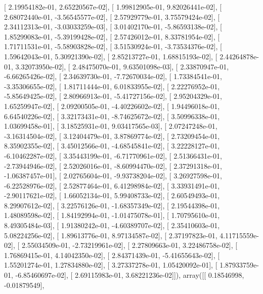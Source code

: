 \documentclass{article}
\begin{document}
       [  2.19954182e-01,   2.65220567e-02],
       [  1.99812905e-01,   9.82026441e-02],
       [  2.68072440e-01,  -3.56545577e-02],
       [  2.57929779e-01,   3.75579424e-02],
       [  2.34112313e-01,  -3.03033259e-03],
       [  3.01402170e-01,  -5.86593138e-02],
       [  1.85299083e-01,  -5.39199428e-02],
       [  2.57426012e-01,   8.33781954e-02],
       [  1.71711531e-01,  -5.58903828e-02],
       [  3.51530924e-01,  -3.73534376e-02],
       [  1.59642043e-01,   5.30921390e-02],
       [  2.85213727e-01,   1.68815193e-02],
       [  2.44264878e-01,   3.32073950e-02],
       [  2.48475070e-01,   9.63501098e-03],
       [  2.33870947e-01,  -6.66265426e-02],
       [  2.34639730e-01,  -7.72670034e-02],
       [  1.73384541e-01,  -3.35306655e-02],
       [  1.81711444e-01,   6.01833955e-02],
       [  2.22276952e-01,  -5.85649425e-02],
       [  2.80966913e-01,  -5.41727156e-02],
       [  2.95204329e-01,   1.65259947e-02],
       [  2.09200505e-01,  -4.40226602e-02],
       [  1.94496018e-01,   6.64540226e-02],
       [  3.32173431e-01,  -8.74625672e-02],
       [  3.50996338e-01,   1.03699458e-01],
       [  3.18525931e-01,   9.03417565e-03],
       [  2.07247248e-01,  -3.16314504e-02],
       [  3.12404479e-01,   3.87869774e-02],
       [  2.73209454e-01,   8.35902355e-02],
       [  3.45012566e-01,  -4.68545841e-02],
       [  3.22228127e-01,  -6.10462287e-02],
       [  3.35443199e-01,  -6.71770961e-02],
       [  2.51366431e-01,  -2.73944946e-02],
       [  2.52026016e-01,  -8.60994470e-02],
       [  2.37291318e-01,  -1.06387457e-01],
       [  2.02765604e-01,  -9.93738204e-02],
       [  3.26927598e-01,  -6.22528976e-02],
       [  2.52877464e-01,   6.41298984e-02],
       [  3.33931491e-01,  -2.90117621e-02],
       [  1.66052134e-01,   5.99408733e-02],
       [  2.60549493e-01,   8.29907612e-02],
       [  3.22576126e-01,  -1.68357349e-02],
       [  2.19544398e-01,   1.48089598e-02],
       [  1.84192994e-01,  -1.01475078e-01],
       [  1.70795610e-01,   8.49305484e-03],
       [  1.91380242e-01,  -4.60389707e-02],
       [  2.35410603e-01,   5.08224256e-02],
       [  1.89613776e-01,   8.97134587e-02],
       [  2.37197823e-01,   4.11715559e-02],
       [  2.55034509e-01,  -2.73219961e-02],
       [  2.27809663e-01,   3.22486758e-02],
       [  1.76869415e-01,   4.14042350e-02],
       [  2.84371439e-01,  -5.41655643e-02],
       [  1.55201274e-01,   1.27834880e-02],
       [  3.27337278e-01,   1.05420092e-01],
       [  1.87933759e-01,  -6.85460697e-02],
       [  2.69115983e-01,   3.68221236e-02]]), array([[ 0.18546998, -0.01879549],
\end{document}
